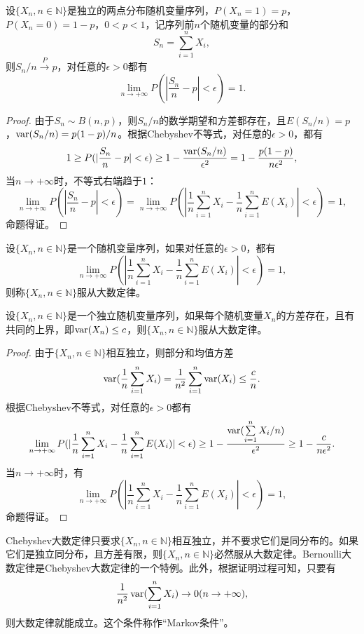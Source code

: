 \begin{theorem}[Bernoulli大数定律]
设$\{X_n,n\in \mathbb N\}$是独立的两点分布随机变量序列，$P(X_n=1)=p$，$P(X_n=0)=1-p$，$0<p<1$，记序列前$n$个随机变量的部分和
\[
    S_n = \sum\limits_{i=1}^n X_i,
\]
则$S_n/n\stackrel{P}{\longrightarrow} p$，对任意的$\epsilon>0$都有
\[
   \lim\limits_{n\rightarrow +\infty} P(|\frac{S_n}{n} - p|<\epsilon) = 1.
\]
\end{theorem}
\begin{proof}
由于$S_n\sim B(n,p)$，则$S_n/n$的数学期望和方差都存在，且$E(S_n/n)=p$，$\operatorname{\mathrm{var}}(S_n/n)=p(1-p)/n$。根据Chebyshev不等式，对任意的$\epsilon>0$，都有
\[
    1\ge  P(|\frac{S_n}{n} - p|< \epsilon) \ge 1- \frac{\operatorname{\mathrm{var}}(S_n/n)}{\epsilon^2} = 1- \frac{p(1-p)}{n\epsilon^2},
\]
当$n\rightarrow +\infty$时，不等式右端趋于$1$：
\[
    \lim\limits_{n\rightarrow +\infty} P(|\frac{S_n}{n} - p|<\epsilon) = \lim\limits_{n\rightarrow +\infty} P(|\frac{1}{n} \sum\limits_{i=1}^n X_i - \frac{1}{n} \sum\limits_{i=1}^n E(X_i)|<\epsilon) = 1,
\]
命题得证。
\end{proof}

\begin{definition}
设$\{X_n, n\in \mathbb N\}$是一个随机变量序列，如果对任意的$\epsilon>0$，都有
\[
    \lim\limits_{n\rightarrow +\infty} P(|\frac{1}{n} \sum\limits_{i=1}^n X_i - \frac{1}{n} \sum\limits_{i=1}^n E(X_i)|<\epsilon) = 1,
\]
则称$\{X_n, n\in \mathbb N\}$服从大数定律。
\end{definition}

\begin{theorem}[Chebyshev大数定律]
设$\{X_n, n\in \mathbb N\}$是一个独立随机变量序列，如果每个随机变量$X_n$的方差存在，且有共同的上界，即$\operatorname{\mathrm{var}}(X_n)\le c$，则$\{X_n, n\in \mathbb N\}$服从大数定律。
\end{theorem}

\begin{proof}
由于$\{X_n, n\in \mathbb N\}$相互独立，则部分和均值方差
\[
    \operatorname{\mathrm{var}}(\frac{1}{n} \sum\limits_{i=1}^n X_i) = \frac{1}{n^2} \sum\limits_{i=1}^n \operatorname{\mathrm{var}}(X_i) \le \frac{c}{n}.
\]
根据Chebyshev不等式，对任意的$\epsilon>0$都有
\[
    \lim\limits_{n\rightarrow +\infty} P(|\frac{1}{n} \sum\limits_{i=1}^n X_i - \frac{1}{n} \sum\limits_{i=1}^n E(X_i)| < \epsilon) \ge  1 - \frac{\operatorname{\mathrm{var}}(\sum\limits_{i=1}^n X_i/n)}{\epsilon^2} \ge 1 - \frac{c}{n\epsilon^2}.
\]
当$n\rightarrow +\infty$时，有
\[
    \lim\limits_{n\rightarrow +\infty} P(|\frac{1}{n} \sum\limits_{i=1}^n X_i - \frac{1}{n} \sum\limits_{i=1}^n E(X_i)|<\epsilon) = 1,
\]
命题得证。
\end{proof}
Chebyshev大数定律只要求$\{X_n, n\in \mathbb N\}$相互独立，并不要求它们是同分布的。如果它们是独立同分布，且方差有限，则$\{X_n, n\in \mathbb N\}$必然服从大数定律。Bernoulli大数定律是Chebyshev大数定律的一个特例。此外，根据证明过程可知，只要有
\[
    \frac{1}{n^2} \operatorname{\mathrm{var}}(\sum\limits_{i=1}^n X_i) \rightarrow 0(n\rightarrow +\infty),
\]
则大数定律就能成立。这个条件称作“Markov条件”。

